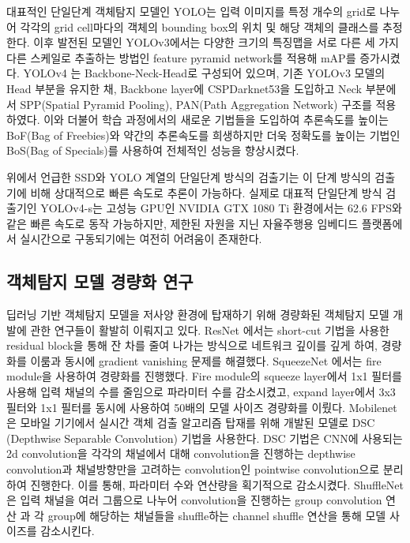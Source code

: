 \documentclass[10pt,twocolumn,letterpaper]{article}
\begin{document}
대표적인 단일단계 객체탐지 모델인 YOLO는 입력 이미지를 특정 개수의 grid로 나누어 각각의 grid cell마다의 객체의 bounding box의 위치 및 해당 객체의 클래스를 추정한다. 이후 발전된 모델인 YOLOv3에서는 다양한 크기의 특징맵을 서로 다른 세 가지 다른 스케일로 추출하는 방법인 feature pyramid network를 적용해 mAP를 증가시켰다. YOLOv4 \cite{bochkovskiy2020yolov4}는 Backbone-Neck-Head로 구성되어 있으며, 기존 YOLOv3 모델의 Head 부분을 유지한 채, Backbone layer에 CSPDarknet53을 도입하고 Neck 부분에서 SPP(Spatial Pyramid Pooling), PAN(Path Aggregation Network) 구조를 적용하였다. 이와 더불어 학습 과정에서의 새로운 기법들을 도입하여 추론속도를 높이는 BoF(Bag of Freebies)와 약간의 추론속도를 희생하지만 더욱 정확도를 높이는 기법인 BoS(Bag of Specials)를 사용하여 전체적인 성능을 향상시켰다.

위에서 언급한 SSD와 YOLO 계열의 단일단계 방식의 검출기는 이 단계 방식의 검출기에 비해 상대적으로 빠른 속도로 추론이 가능하다. 실제로 대표적 단일단계 방식 검출기인 YOLOv4-s는 고성능 GPU인 NVIDIA GTX 1080 Ti 환경에서는 62.6 FPS와 같은 빠른 속도로 동작 가능하지만, 제한된 자원을 지닌 자율주행용 임베디드 플랫폼에서 실시간으로 구동되기에는 여전히 어려움이 존재한다.

\vspace{.25cm}
\subsection{객체탐지 모델 경량화 연구}
딥러닝 기반 객체탐지 모델을 저사양 환경에 탑재하기 위해 경량화된 객체탐지 모델 개발에 관한 연구들이 활발히 이뤄지고 있다. ResNet \cite{he2016deep}에서는 short-cut 기법을 사용한 residual block을 통해 잔 차를 줄여 나가는 방식으로 네트워크 깊이를 깊게 하여, 경량화를 이룸과 동시에 gradient vanishing 문제를 해결했다. SqueezeNet \cite{iandola2016squeezenet}에서는 fire module을 사용하여 경량화를 진행했다. Fire module의 squeeze layer에서 1x1 필터를 사용해 입력 채널의 수를 줄임으로 파라미터 수를 감소시켰고, expand layer에서 3x3 필터와 1x1 필터를 동시에 사용하여 50배의 모델 사이즈 경량화를 이뤘다.
Mobilenet \cite{howard2017mobilenets, sandler2018mobilenetv2}은 모바일 기기에서 실시간 객체 검출 알고리즘 탑재를 위해 개발된 모델로 DSC (Depthwise Separable Convolution) 기법을 사용한다. DSC 기법은 CNN에 사용되는 2d convolution을 각각의 채널에서 대해 convolution을 진행하는 depthwise convolution과 채널방향만을 고려하는 convolution인 pointwise convolution으로 분리하여 진행한다. 이를 통해, 파라미터 수와 연산량을 획기적으로 감소시켰다. ShuffleNet \cite{zhang2018shufflenet, ma2018shufflenet}은 입력 채널을 여러 그룹으로 나누어 convolution을 진행하는 group convolution 연산 과 각 group에 해당하는 채널들을 shuffle하는 channel shuffle 연산을 통해 모델 사이즈를 감소시킨다.
\end{document}
